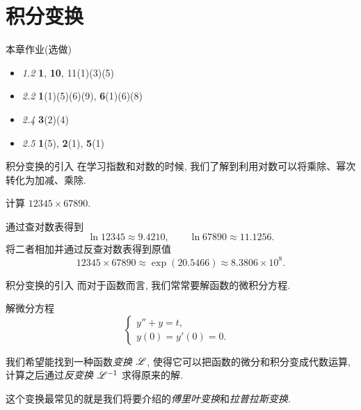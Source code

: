 \part{积分变换}


\begin{frame}[<*>]{本章作业(选做)}
\begin{itemize}
\item \emph{1.2} \textbf{1}, \textbf{10}, {11}(1)(3)(5)
\item \emph{2.2} \textbf{1}(1)(5)(6)(9), \textbf{6}(1)(6)(8)
\item \emph{2.4} \textbf{3}(2)(4)
\item \emph{2.5} \textbf{1}(5), \textbf{2}(1), \textbf{5}(1)
\end{itemize}
\end{frame}


\begin{frame}{积分变换的引入}
\onslide<+->
在学习指数和对数的时候, 我们了解到利用对数可以将乘除、幂次转化为加减、乘除.
\begin{example}
计算 $12345\times 67890$.
\end{example}
\begin{solution}
通过查对数表得到
\[\ln 12345\approx 9.4210,\qquad\ln 67890\approx 11.1256.\]
\onslide<+->
将二者相加并通过反查对数表得到原值
\[12345\times 67890\approx \exp(20.5466)\approx 8.3806\times 10^8.\]
\end{solution}
\end{frame}


\begin{frame}{积分变换的引入}
\onslide<+->
而对于函数而言, 我们常常要解函数的微积分方程.
\begin{example}
解微分方程
	\[\begin{cases}
		y''+y=t	,& \\
		y(0)=y'(0)=0.&
	\end{cases}\]
\end{example}
\begin{solution}
\indent
我们希望能找到一种函数\emph{变换 $\mathscr{L}$}, 使得它可以把函数的微分和积分变成代数运算, 计算之后通过\emph{反变换 $\mathscr{L}^{-1}$} 求得原来的解.

\indent
\onslide<+->
这个变换最常见的就是我们将要介绍的\emph{傅里叶变换}和\emph{拉普拉斯变换}.
\end{solution}
\end{frame}

